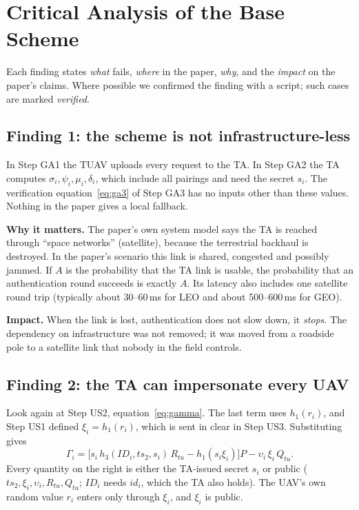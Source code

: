 \section{Critical Analysis of the Base Scheme}\label{sec:findings}
Each finding states \emph{what} fails, \emph{where} in the paper, \emph{why}, and the \emph{impact} on the paper's claims.
Where possible we confirmed the finding with a script; such cases are marked \emph{verified}.

\subsection{Finding 1: the scheme is not infrastructure-less}
\begin{flawbox}[title={Authentication requires a live satellite link to the TA}]
\begin{finding}\label{f:online}
In Step GA1 the TUAV uploads every request to the TA. In Step GA2 the TA computes $\sigma_i,\psi_i,\mu_i,\delta_i$, which include all
pairings and need the secret $s_i$. The verification equation~\eqref{eq:ga3} of Step GA3 has no inputs other than these values. Nothing in the paper
gives a local fallback.
\end{finding}
\textbf{Why it matters.} The paper's own system model says the TA is reached through ``space networks'' (satellite), because the
terrestrial backhaul is destroyed. In the paper's scenario this link is shared, congested and possibly jammed. If $A$ is the probability that the
TA link is usable, the probability that an authentication round succeeds is exactly $A$. Its latency also includes one satellite round trip
(typically about 30--60\,ms for LEO and about 500--600\,ms for GEO).

\textbf{Impact.} When the link is lost, authentication does not slow down, it \emph{stops}. The dependency on infrastructure was not removed; it
was moved from a roadside pole to a satellite link that nobody in the field controls.
\end{flawbox}

\subsection{Finding 2: the TA can impersonate every UAV}
Look again at Step US2, equation~\eqref{eq:gamma}. The last term uses $h_1(r_i)$, and Step US1 defined $\xi_i=h_1(r_i)$, which is sent in clear
in Step US3. Substituting gives
\begin{equation}
  \Gamma_i=\big[s_i\,h_3(ID_i,ts_2,s_i)\,R_{tu}-h_1(s_i\xi_i)\big]P-\upsilon_i\,\xi_i\,Q_{tu}.\label{eq:gamma2}
\end{equation}
Every quantity on the right is either the TA-issued secret $s_i$ or public ($ts_2,\xi_i,\upsilon_i,R_{tu},Q_{tu}$; $ID_i$ needs $id_i$, which
the TA also holds). The UAV's own random value $r_i$ enters only through $\xi_i$, and $\xi_i$ is public.

